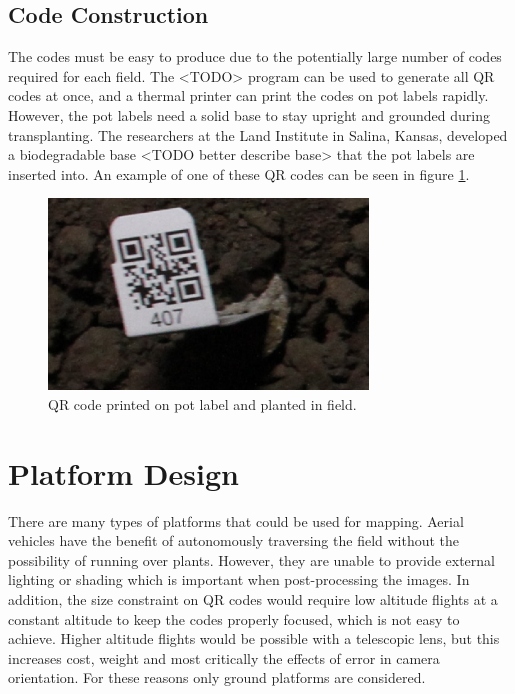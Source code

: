 \subsection{Code Construction}

The codes must be easy to produce due to the potentially large number of codes required for each field.  The <TODO> program can be used to generate all QR codes at once, and a thermal printer can print the codes on pot labels rapidly.  However, the pot labels need a solid base to stay upright and grounded during transplanting. The researchers at the Land Institute in Salina, Kansas, developed a biodegradable base <TODO better describe base> that the pot labels are inserted into.  An example of one of these QR codes can be seen in figure \ref{QR_code}.

\begin{figure}[htb]
	\centering
    \includegraphics[height=2in]{figures/qr_code_407.png}
    \caption[QR code]{QR code printed on pot label and planted in field.}
    \label{QR_code}
\end{figure}

\section{Platform Design}
\label{section:platform_design}

There are many types of platforms that could be used for mapping.  Aerial vehicles have the benefit of autonomously traversing the field without the possibility of running over plants. However, they are unable to provide external lighting or shading which is important when post-processing the images. In addition, the size constraint on QR codes would require low altitude flights at a constant altitude to keep the codes properly focused, which is not easy to achieve.  Higher altitude flights would be possible with a telescopic lens, but this increases cost, weight and most critically the effects of error in camera orientation.  For these reasons only ground platforms are considered.


